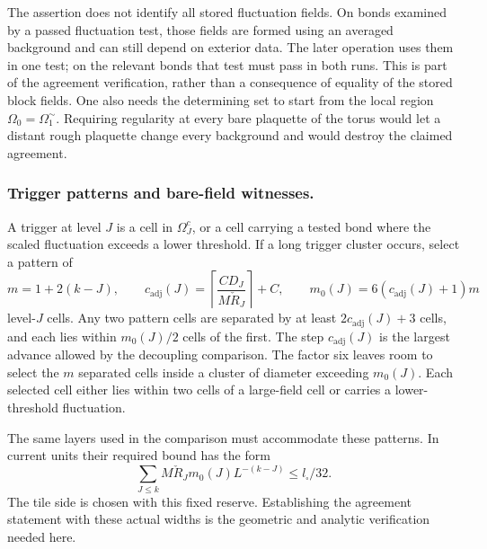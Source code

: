\documentclass[11pt,letterpaper,reqno]{amsart}
\theoremstyle{definition}
\theoremstyle{remark}
\begin{document}
The assertion does not identify all stored fluctuation fields.
On bonds examined by a passed fluctuation test, those fields are
formed using an averaged background and can still depend on
exterior data. The later operation uses them in one test; on the
relevant bonds that test must pass in both runs. This is part of
the agreement verification, rather than a consequence of equality
of the stored block fields. One also needs the determining set to
start from the local region $\Omega_0=\Omega_1^\sim$. Requiring
regularity at every bare plaquette of the torus would let a distant
rough plaquette change every background and would destroy the
claimed agreement.

\subsubsection*{Trigger patterns and bare-field witnesses.}

A trigger at level $J$ is a cell in $\Omega_J^c$, or a cell
carrying a tested bond where the scaled fluctuation exceeds a
lower threshold. If a long trigger cluster occurs, select a
pattern of
\begin{equation}\label{eq:history-trigger-pattern}
 m=1+2(k-J),\qquad
 c_{\mathrm{adj}}(J)=
       \left\lceil\frac{CD_J}{M\check R_J}\right\rceil+C,
 \qquad
 m_0(J)=6(c_{\mathrm{adj}}(J)+1)m
\end{equation}
level-$J$ cells. Any two pattern cells are separated by at least
$2c_{\mathrm{adj}}(J)+3$ cells, and each lies within
$m_0(J)/2$ cells of the first. The step $c_{\mathrm{adj}}(J)$
is the largest advance allowed by the decoupling comparison.
The factor six leaves room to select the $m$ separated cells
inside a cluster of diameter exceeding $m_0(J)$.
Each selected cell either lies within two cells of a large-field
cell or carries a lower-threshold fluctuation.

The same layers used in the comparison must accommodate these
patterns. In current units their required bound has the form
\[
 \sum_{J\le k}M\check R_Jm_0(J)L^{-(k-J)}
                              \le l_\square/32.
\]
The tile side is chosen with this fixed reserve. Establishing the
agreement statement with these actual widths is the geometric
and analytic verification needed here.
\end{document}
